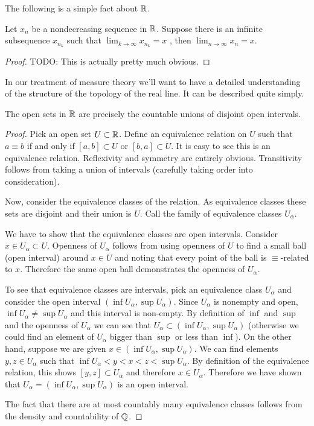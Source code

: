 The following is a simple fact about $\mathbb{R}$.
\begin{lem}\label{IncreasingSequenceWithConvergentSubsequence}Let $x_n$ be a nondecreasing sequence in $\mathbb{R}$.  Suppose
  there is an infinite subsequence $x_{n_k}$ such that $\lim_{k \to
    \infty} x_{n_k} = x$ , then $\lim_{n \to \infty} x_n = x$.
\end{lem}
\begin{proof}
TODO:  This is actually pretty much obvious.
\end{proof}
In our treatment of measure theory we'll want to have a detailed
understanding of the structure of the topology of the real line.  It
can be described quite simply.
\begin{lem}\label{OpenSetsOfReals}The open sets in $\mathbb{R}$ are precisely the countable
  unions of disjoint open intervals.
\end{lem}
\begin{proof}Pick an open set $U \subset \mathbb{R}$.  Define an
  equivalence relation on $U$ such that $a \equiv b$ if and only if
  $[a,b] \subset U$ or $[b,a] \subset U$.  It is easy to see this is an equivalence
  relation.  Reflexivity and symmetry are entirely obvious.
  Transitivity follows from taking a union of intervals (carefully
  taking order into consideration).  

Now, consider the equivalence classes of the relation. As equivalence
classes these sets are disjoint and their union is $U$.  Call the
family of equivalence classes $U_\alpha$.

We have to show that
the equivalence classes are open intervals.  Consider $x \in U_\alpha
\subset U$.  Openness of $U_\alpha$ follows from using openness of $U$ to find a small ball (open interval) around $x \in U$ and noting that every
point of the ball is $\equiv$-related to $x$.  Therefore the same open
ball demonstrates the openness of $U_\alpha$.

To see that equivalence classes are intervals, pick an equivalence
class $U_\alpha$ and consider the open interval $(\inf U_\alpha, \sup
U_\alpha)$.  Since $U_\alpha$ is nonempty and open, $\inf U_\alpha \neq \sup
U_\alpha $ and this interval is non-empty.  By definition of $\inf$ and $\sup$ and the openness of
$U_\alpha$ we can see that $U_\alpha \subset (\inf U_\alpha, \sup
U_\alpha)$ (otherwise we could find an element of $U_\alpha$ bigger
than $\sup$ or less than $\inf$).  On the other hand, suppose we are
given $x \in (\inf U_\alpha, \sup U_\alpha)$.  We can find elements
$y,z \in U_\alpha$ such that $\inf U_\alpha  < y < x < z <\sup  U_\alpha$.
By definition of the equivalence relation, this shows $[y,z] \subset
U_\alpha$ and therefore $x \in U_\alpha$.  Therefore we have shown
that $U_\alpha =  (\inf U_\alpha, \sup U_\alpha)$ is an open interval.

The fact that there are
at most countably many equivalence classes follows from the density
and countability of $\mathbb{Q}$.
\end{proof} 

